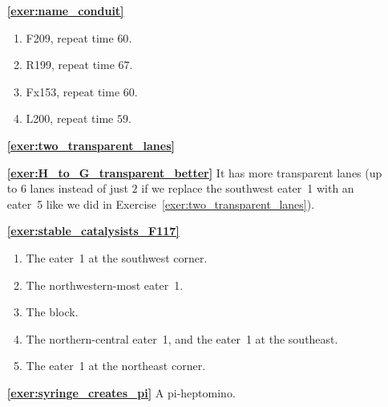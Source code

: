 \begin{multicols}{2}
	\begin{itemize}[leftmargin=0em]
		\item[\bf\color{ocre}\sffamily\ref{exer:name_conduit}] \begin{enumerate}[leftmargin=1.5em,label=\bf\color{ocre}(\alph*)]
			\item F209, repeat time $60$.
			
			\item R199, repeat time $67$.
			
			\item Fx153, repeat time $60$.
			
			\item L200, repeat time $59$.\\[-0.1em]
		\end{enumerate}
		
		
		\item[\bf\color{ocre}\sffamily\ref{exer:two_transparent_lanes}]  \\[0.3em]
		
		
		\item[\bf\color{ocre}\sffamily\ref{exer:H_to_G_transparent_better}] It has more transparent lanes (up to $6$ lanes instead of just $2$ if we replace the southwest eater~1 with an eater~5 like we did in Exercise~\ref{exer:two_transparent_lanes}).\\
		
		
		\item[\bf\color{ocre}\sffamily\ref{exer:stable_catalysists_F117}] \begin{enumerate}[leftmargin=1.5em,label=\bf\color{ocre}(\alph*)]
			\item The eater~1 at the southwest corner.
			
			\item The northwestern-most eater~1.
			
			\item The block.
			
			\item The northern-central eater~1, and the eater~1 at the southeast.
			
			\item The eater~1 at the northeast corner.\\
		\end{enumerate}
		
		
		\item[\bf\color{ocre}\sffamily\ref{exer:syringe_creates_pi}] A pi-heptomino. \\
		

\end{itemize}
\end{multicols}
